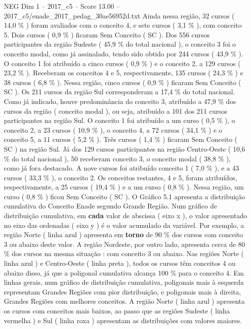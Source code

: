 \begin{textsample}{NEG Dim 1 – 2017\_c5 – Score 13.00 – 2017\_c5/enade\_2017\_pedag\_30ae56952d.txt}
Ainda nessa região, 32 cursos ( 14,0 \% ) foram avaliados com o conceito 4, e sete cursos ( 3,1 \% ), com conceito 5.
Dois cursos ( 0,9 \% ) ficaram Sem Conceito ( SC ).
Dos 556 cursos participantes da região Sudeste ( 45,9 \% do total nacional ), o conceito 3 foi o conceito modal, como já assinalado, tendo sido obtido por 244 cursos ( 43,9 \% ).
O conceito 1 foi atribuído a cinco cursos ( 0,9 \% ) e o conceito 2, a 129 cursos ( 23,2 \% ).
Receberam os conceitos 4 e 5, respectivamente, 135 cursos ( 24,3 \% ) e 38 cursos ( 6,8 \% ).
Nessa região, cinco cursos ( 0,9 \% ) ficaram Sem Conceito ( SC ).
Os 211 cursos da região Sul corresponderam a 17,4 \% do total nacional.
Como já indicado, houve predominância do conceito 3, atribuído a 47,9 \% dos cursos da região ( conceito modal ), ou seja, atribuído a 101 dos 211 cursos participantes na região Sul.
O conceito 1 foi atribuído a um curso ( 0,5 \% ), o conceito 2, a 23 cursos ( 10,9 \% ), o conceito 4, a 72 cursos ( 34,1 \% ) e o conceito 5, a 11 cursos ( 5,2 \% ).
Três cursos ( 1,4 \% ) ficaram Sem Conceito ( SC ) na região Sul.
Já dos 129 cursos participantes na região Centro-Oeste ( 10,6 \% do total nacional ), 50 receberam conceito 3, o conceito modal ( 38,8 \% ), como já fora destacado.
A nove cursos foi atribuído conceito 1 ( 7,0 \% ), e a 43 cursos ( 33,3 \% ), o conceito 2.
Os conceitos restantes, 4 e 5, foram atribuídos, respectivamente, a 25 cursos ( 19,4 \% ) e a um curso ( 0,8 \% ).
Nessa região, um curso ( 0,8 \% ) ficou Sem Conceito ( SC ).
O Gráfico 5.1 apresenta a distribuição cumulativa do Conceito Enade segundo Grande Região.
Num gráfico de distribuição cumulativa, em \textbf{cada} valor de abscissa ( eixo x ), o valor apresentado no eixo das ordenadas ( eixo y ) é o valor acumulado da variável.
Por exemplo, a região Norte ( linha azul ) apresenta em \textbf{torno} de 90 \% dos cursos com conceito 3 ou abaixo deste valor.
A região Nordeste, por outro lado, apresenta cerca de 80 \% dos cursos na mesma situação : com conceito 3 ou abaixo.
Nas regiões Norte ( linha azul ) e Centro-Oeste ( linha preta ), todos os cursos têm conceitos 4 ou abaixo disso, já que a poligonal cumulativa alcança 100 \% para o conceito 4.
Em linhas gerais, num gráfico de distribuição cumulativa, poligonais mais à esquerda representam Grandes Regiões com pior distribuição, e poligonais mais à direita, Grandes Regiões com melhores conceitos.
A região Norte ( linha azul ) apresenta os cursos com conceitos mais baixos, ao passo que as regiões Sudeste ( linha vermelha ) e Sul ( linha roxa ) apresentam as distribuições com valores maiores.

\end{textsample}
